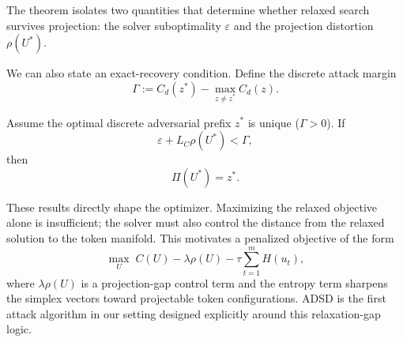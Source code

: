 The theorem isolates two quantities that determine whether relaxed search
survives projection: the solver suboptimality $\varepsilon$ and the
projection distortion $\rho(U^*)$.

We can also state an exact-recovery condition. Define the discrete attack
margin
\[
\Gamma := C_d(z^*) - \max_{z \neq z^*} C_d(z).
\]

\begin{corollary}
\label{cor:exact-recovery}
Assume the optimal discrete adversarial prefix $z^*$ is unique
($\Gamma > 0$). If
\[
\varepsilon + L_C \rho(U^*) < \Gamma,
\]
then
\[
\Pi(U^*) = z^*.
\]
\end{corollary}

These results directly shape the optimizer. Maximizing the relaxed objective
alone is insufficient; the solver must also control the distance from the
relaxed solution to the token manifold. This motivates a penalized objective of
the form
\[
\max_U \; C(U) - \lambda \rho(U) - \tau \sum_{t=1}^{m} H(u_t),
\]
where $\lambda \rho(U)$ is a projection-gap control term and the entropy term
sharpens the simplex vectors toward projectable token configurations. ADSD is
the first attack algorithm in our setting designed explicitly around this
relaxation-gap logic.
